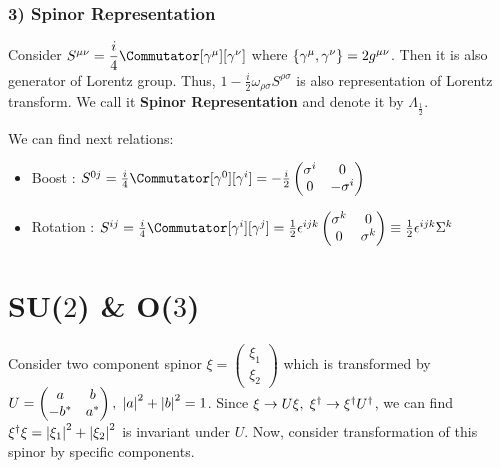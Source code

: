 \documentclass[11pt,letterpaper]{article}
\begin{document}
\subsubsection*{3) Spinor Representation}

Consider $S^{\mu\nu} = \dfrac{i}{4}\Commutator[\gamma^\mu][\gamma^\nu]$ where $\{ \gamma^\mu , \gamma^\nu \} = 2g^{\mu\nu}$. Then it is also generator of Lorentz group.
Thus, $1-\frac{i}{2}\omega_{\rho\sigma}S^{\rho\sigma}$ is also representation of Lorentz transform. We call it \textbf{Spinor Representation} and
denote it by $\Lambda_{\frac{1}{2}}$.

We can find next relations:
\begin{itemize}
 \item Boost : $S^{0j} = \tfrac{i}{4}\Commutator[\gamma^{0}][\gamma^{i}]=-\frac{i}{2}
     \begin{pmatrix}
         \sigma^i & 0 \\
         0 & -\sigma^{i}
     \end{pmatrix}$
 \item Rotation : $S^{ij} = \tfrac{i}{4}\Commutator[\gamma^{i}][\gamma^{j}]=\frac{1}{2}\epsilon^{ijk}
     \begin{pmatrix}
         \sigma^{k} & 0 \\
         0 & \sigma^{k}
     \end{pmatrix}
     \equiv \tfrac{1}{2}\epsilon^{ijk}\Sigma^{k}$
\end{itemize}








\newpage
\appendix

\section{SU($2$) \& O($3$)}

Consider two component spinor $\xi =
\begin{pmatrix}
 \xi_1 \\
 \xi_2
\end{pmatrix}$
which is transformed by $ U =
\begin{pmatrix}
 a & b \\
 -b^* & a^* 
\end{pmatrix}
,\hspace{0.1cm} \left|a\right|^2 + \left|b\right|^2 = 1$. \newline
Since $\xi \rightarrow U\xi,\hspace{0.1cm} \xi^{\dagger} \rightarrow \xi^{\dagger}U^{\dagger}$, we can find $\xi^{\dagger}\xi = \left|\xi_1\right|^2+\left|\xi_2\right|^2 $ is invariant under $U$.
Now, consider transformation of this spinor by specific components.
\end{document}
